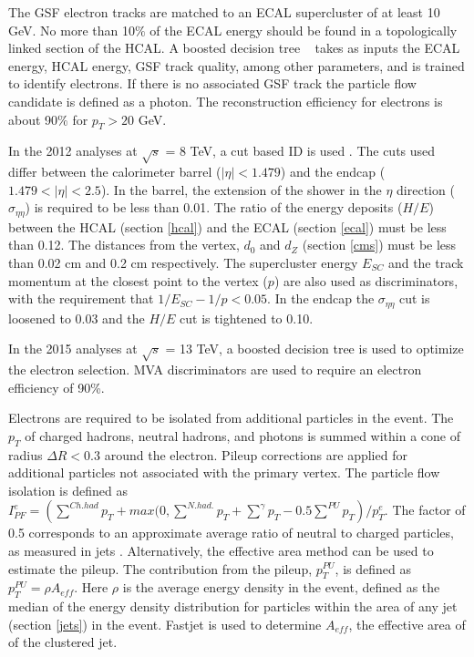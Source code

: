 \documentclass[oneside, letterpaper, oldfontcommands]{memoir}
\begin{document}
\qquad The GSF electron tracks are matched to an ECAL supercluster of at least 10 GeV. No more than 10$\%$ of the ECAL energy should be found in a topologically linked section of the HCAL. A boosted decision tree ~\cite{Hocker:2007ht} takes as inputs the ECAL energy, HCAL energy, GSF track quality, among other parameters, and is trained to identify electrons. If there is no associated GSF track the particle flow candidate is defined as a photon. The reconstruction efficiency for electrons is about 90$\%$ for $p_{T} > 20$ GeV. ~\cite{Khachatryan:2015hwa}

\qquad In the 2012 analyses at $\sqrt{s}$ = 8 TeV, a cut based ID is used \cite{Khachatryan:2015hwa}. The cuts used differ between the calorimeter barrel ($|\eta| < 1.479$) and the endcap ($1.479 < |\eta| < 2.5$). In the barrel, the extension of the shower in the $\eta$ direction ($\sigma_{\eta\eta}$) is required to be less than 0.01. The ratio of the energy deposits ($H/E$) between the HCAL (section \ref{hcal}) and the ECAL (section \ref{ecal}) must be less than 0.12.    The distances from the vertex, $d_{0}$ and $d_{Z}$ (section \ref{cms}) must be less than 0.02 cm and 0.2 cm respectively. The supercluster energy $E_{SC}$ and the track momentum at the closest point to the vertex ($p$) are also used as discriminators, with the requirement that $1/E_{SC} - 1/p < 0.05$. In the endcap the $\sigma_{\eta\eta}$ cut is loosened to 0.03 and the $H/E$ cut is tightened to 0.10.

\qquad In the 2015 analyses at $\sqrt{s}$ = 13 TeV, a boosted decision tree is used to optimize the electron selection. MVA discriminators are used to require an electron efficiency of 90\%.

\qquad Electrons are required to be isolated from additional particles in the event. The $p_{T}$ of charged hadrons, neutral hadrons, and photons is summed within a cone of radius $\Delta R < 0.3$ around the electron.  Pileup corrections are applied for additional particles not associated with the primary vertex. The particle flow isolation is defined as $I_{PF}^{e} = \left(\sum\limits^{Ch. had} p_{T} + max(0, \sum\limits^{N. had.} p_{T} + \sum\limits^{\gamma} p_{T} - 0.5 \sum\limits^{PU} p_{T}\right)/p_{T}^{e}$. The factor of 0.5 corresponds to an approximate average ratio of neutral to charged particles, as measured in jets \cite{CMS-PAS-PFT-10-002}. Alternatively, the effective area method can be used to estimate the pileup. The contribution from the pileup, $p_{T}^{PU}$, is defined as $p_{T}^{PU} = \rho A_{eff}$. Here $\rho$ is the average energy density in the event, defined as the median of the energy density distribution for particles within the area of any jet (section \ref{jets}) in the event.\cite{Khachatryan:2015hwa} {\sc Fastjet} \cite{Cacciari:2011ma} is used to determine $A_{eff}$, the effective area of of the clustered jet.  
\end{document}
